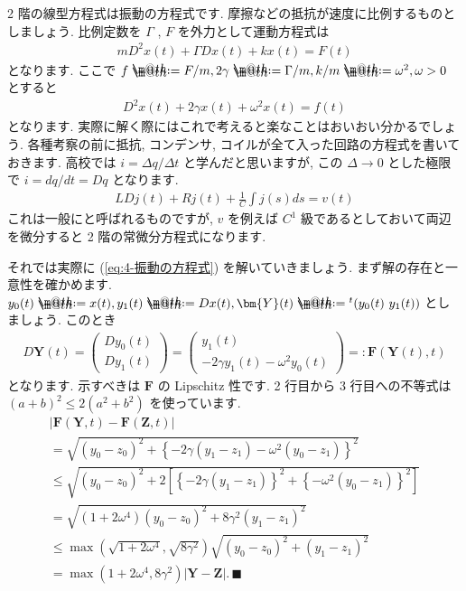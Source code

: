 \documentclass[openany, a4paper, oneside]{book}
\makeatletter
\newcommand*{\defeq}{\mathrel{\rlap{%
\raisebox{0.3ex}{$\m@th\cdot$}}%
\raisebox{-0.3ex}{$\m@th\cdot$}}%
=}
\theoremstyle{break}
\theoremstyle{breakdefn}
\newcommand{\abs}[1]{\left|#1\right|}
\newcommand{\bs}{\blacksquare}
\makeatother
\begin{document}
2 階の線型方程式は振動の方程式です.
摩擦などの抵抗が速度に比例するものとしましょう.
比例定数を $\Gamma$ ,  $F$ を外力として運動方程式は
\begin{gather}
m D^2 x (t) + \Gamma D x (t) + k x (t) = F (t)
\end{gather}
となります.
ここで $f \defeq F/m , 2 \gamma \defeq \Gamma / m , k/m \defeq \omega^2 , \omega>0$ とすると
\begin{gather}
D^2 x (t) + 2 \gamma x (t) + \omega^2 x (t) = f (t)
\label{eq:4-振動の方程式}
\end{gather}
となります.
実際に解く際にはこれで考えると楽なことはおいおい分かるでしょう.
各種考察の前に抵抗, コンデンサ, コイルが全て入った回路の方程式を書いておきます.
高校では $i = \varDelta q / \varDelta t$ と学んだと思いますが,
この $\varDelta \to 0$ とした極限で $i = dq / dt = D q$ となります.
\begin{gather}
L D j (t) + R j (t) + \frac{1}{C} \int j (s) ds = v (t)
\end{gather}
これは一般にと呼ばれるものですが,
$v$ を例えば $C^1$ 級であるとしておいて両辺を微分すると 2 階の常微分方程式になります.

それでは実際に (\ref{eq:4-振動の方程式}) を解いていきましょう.
まず解の存在と一意性を確かめます.
$y_0 (t) \defeq x (t) , y_1 (t) \defeq Dx (t) , \bm{Y}(t) \defeq {^t}( y_0 (t) \,\, y_1 (t) )$ としましょう.
このとき
\begin{gather}
D \bm{Y}(t)
=
\begin{pmatrix}
D y_0 (t) \\
D y_1 (t)
\end{pmatrix}
=
\begin{pmatrix}
y_1 (t) \\
-2 \gamma y_1 (t) - \omega ^2 y_0 (t)
\end{pmatrix}
=:
\bm{F}(\bm{Y}(t) ,t)
\end{gather}
となります.
示すべきは $\bm{F}$ の Lipschitz 性です.
2 行目から 3 行目への不等式は $( a + b )^2 \leq 2 ( a^2 + b^2 )$ を使っています.
\begin{gather}
\abs{\bm{F}(\bm{Y},t) - \bm{F}( \bm{Z}, t )} \\
=
\sqrt{ ( y_0 - z_0 )^2 + \left \{ -2\gamma ( y_1 - z_1 ) - \omega ^2 ( y_0 - z_1 ) \right \} ^2 } \\
\leq
\sqrt{ ( y_0 - z_0 )^2 +
2 \left[ \left \{ -2\gamma ( y_1 - z_1 ) \right \} ^2 + \left \{ - \omega ^2 ( y_0 - z_1 ) \right \} ^2 \right ] } \\
=
\sqrt{ ( 1 + 2 \omega ^4 ) ( y_0 - z_0 )^2 + 8 \gamma ^2 ( y_1 - z_1 ) ^2 } \\
\leq
\max \left ( \sqrt{ 1 + 2 \omega ^4 } , \sqrt{ 8 \gamma ^2 } \right) \sqrt{ ( y_0 - z_0 )^2 + ( y_1 - z_1 ) ^2 } \\
=
\max ( 1 + 2 \omega ^4 , 8 \gamma ^2 ) | \bm{Y} - \bm{Z} | . \, \bs
\end{gather}
\end{document}
